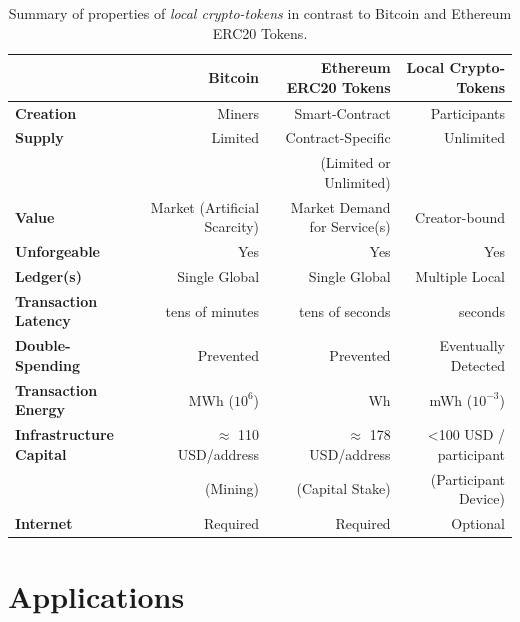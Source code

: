 \documentclass[sigconf,9pt]{acmart}
\begin{document}
\begin{table}[t]
\caption{Summary of properties of \textit{local crypto-tokens} in contrast to Bitcoin and Ethereum ERC20 Tokens.}
\label{tb:properties}
\begin{tabular}{l|r|r|r|}
              & \textbf{Bitcoin} & \textbf{Ethereum ERC20 Tokens} & \textbf{Local Crypto-Tokens} \\
\hline
\textbf{Creation}        & Miners                              & Smart-Contract         & Participants \\
\textbf{Supply}           & Limited                             & Contract-Specific      & Unlimited \\
                                   &                                         & (Limited or Unlimited) & \\
\textbf{Value}             & Market (Artificial Scarcity) & Market Demand for Service(s) & Creator-bound \\
\textbf{Unforgeable}   & Yes                                   & Yes                                                             & Yes \\
\textbf{Ledger(s)}            & Single Global               & Single Global                        & Multiple Local \\
\textbf{Transaction Latency} & tens of minutes      & tens of seconds                                                      & seconds \\
\textbf{Double-Spending} & Prevented                 & Prevented                                                 & Eventually Detected \\
\textbf{Transaction Energy} & MWh  ($10^{6}$)                             & Wh                                                  & mWh ($10^{-3}$) \\
\textbf{Infrastructure Capital} & $\approx$ 110 USD/address
                                    & $\approx$ 178 USD/address   
                                    & <100 USD / participant \\
                                    & (Mining)      &  (Capital Stake)  & (Participant Device)  \\
\textbf{Internet} & Required                            & Required                                  & Optional \\
\end{tabular}
\end{table}

\section{Applications}
\label{section:applications}
\end{document}
